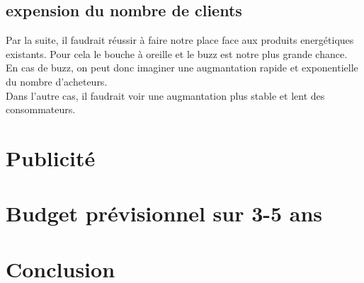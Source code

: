 \documentclass{article}
\begin{document}
\subsection{expension du nombre de clients}
Par la suite, il faudrait réussir à faire notre place face aux produits energétiques existants. Pour cela le bouche à oreille et le buzz est notre plus grande chance.\\
En cas de buzz, on peut donc imaginer une augmantation rapide et exponentielle du nombre d'acheteurs.\\
Dans l'autre cas, il faudrait voir une augmantation plus stable et lent des consommateurs.

\section{Publicité}

\section{Budget prévisionnel sur 3-5 ans}

\section{Conclusion}



\end{document}

